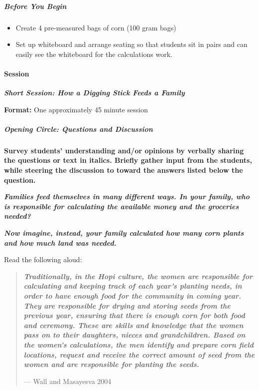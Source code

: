 \documentclass[12pt,]{article}
\providecommand{\tightlist}{%
  \setlength{\itemsep}{0pt}\setlength{\parskip}{0pt}}
\let\oldparagraph\paragraph
\renewcommand{\paragraph}[1]{\oldparagraph{#1}\mbox{}}
\let\oldsubparagraph\subparagraph
\renewcommand{\subparagraph}[1]{\oldsubparagraph{#1}\mbox{}}
\begin{document}
\hypertarget{before-you-begin-1}{%
\subparagraph{Before You Begin}\label{before-you-begin-1}}

\begin{itemize}
\tightlist
\item
  Create 4 pre-measured bags of corn (100 gram bags)
\item
  Set up whiteboard and arrange seating so that students sit in pairs and can easily see the whiteboard for the calculations work.
\end{itemize}

\hypertarget{session}{%
\paragraph{Session}\label{session}}

\textbf{\emph{Short Session: How a Digging Stick Feeds a Family}}

\textbf{Format:} One approximately 45 minute session

\hypertarget{opening-circle-questions-and-discussion-3}{%
\subparagraph{Opening Circle: Questions and Discussion}\label{opening-circle-questions-and-discussion-3}}

\textbf{Survey students' understanding and/or opinions by verbally sharing the questions or text in italics. Briefly gather input from the students, while steering the discussion to toward the answers listed below the question.}

\textbf{\emph{Families feed themselves in many different ways. In your family, who is responsible for calculating the available money and the groceries needed? }}

\textbf{\emph{Now imagine, instead, your family calculated how many corn plants and how much land was needed.}}

Read the following aloud:

\begin{quote}
\textbf{\emph{Traditionally, in the Hopi culture, the women are responsible for calculating and keeping track of each year's planting needs, in order to have enough food for the community in coming year. They are responsible for drying and storing seeds from the previous year, ensuring that there is enough corn for both food and ceremony. These are skills and knowledge that the women pass on to their daughters, nieces and grandchildren. Based on the women's calculations, the men identify and prepare corn field locations, request and receive the correct amount of seed from the women and are responsible for planting the seeds.}}

--- Wall and Masayesva 2004
\end{quote}
\end{document}
